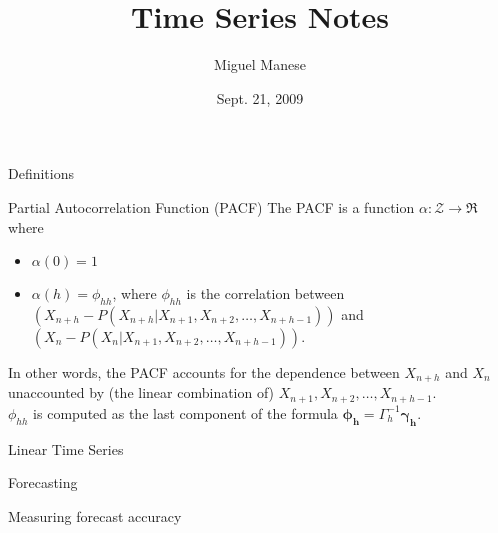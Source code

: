 \documentclass{article}
\title{Time Series Notes}
\author{Miguel Manese}
\date{Sept. 21, 2009}
\begin{document}
\maketitle

\begin{section}{Definitions}

\begin{subsection}{Partial Autocorrelation Function (PACF)}
The PACF is a function $\alpha : \mathcal{Z} \rightarrow \Re$ where

\begin{itemize}
\item $\alpha(0) = 1$
\item $\alpha(h) = \phi_{hh}$, where $\phi_{hh}$ is the correlation between
$(X_{n+h} - P(X_{n+h} | X_{n+1}, X_{n+2}, \ldots, X_{n+h-1}))$ and
$(X_{n} - P(X_{n} | X_{n+1}, X_{n+2}, \ldots, X_{n+h-1}))$. 
\end{itemize} 

\noindent In other words, the PACF accounts for the dependence between 
$X_{n+h}$ and 
$X_{n}$ unaccounted by (the linear combination of) $X_{n+1}, X_{n+2}, \ldots,
X_{n+h-1}$.\\

$\phi_{hh}$ is computed as the last component of the formula
$\mathbf{\phi_{h}} = \Gamma_{h}^{-1} \mathbf{\gamma_{h}}$. 
\end{subsection}
\end{section}


\begin{section}{Linear Time Series}
\end{section}

\begin{section}{Forecasting}
\begin{subsection}{Measuring forecast accuracy}
\end{subsection}
\end{section}
\end{document}
